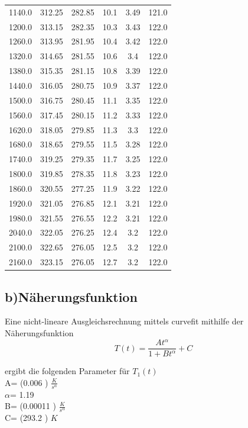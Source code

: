 \begin{table}
\begin{tabular}{cccccc}
1140.0 & 312.25 & 282.85 & 10.1 & 3.49 & 121.0 \\
1200.0 & 313.15 & 282.35 & 10.3 & 3.43 & 122.0 \\
1260.0 & 313.95 & 281.95 & 10.4 & 3.42 & 122.0 \\
1320.0 & 314.65 & 281.55 & 10.6 & 3.4 & 122.0 \\
1380.0 & 315.35 & 281.15 & 10.8 & 3.39 & 122.0 \\
1440.0 & 316.05 & 280.75 & 10.9 & 3.37 & 122.0 \\
1500.0 & 316.75 & 280.45 & 11.1 & 3.35 & 122.0 \\
1560.0 & 317.45 & 280.15 & 11.2 & 3.33 & 122.0 \\
1620.0 & 318.05 & 279.85 & 11.3 & 3.3 & 122.0 \\
1680.0 & 318.65 & 279.55 & 11.5 & 3.28 & 122.0 \\
1740.0 & 319.25 & 279.35 & 11.7 & 3.25 & 122.0 \\
1800.0 & 319.85 & 278.35 & 11.8 & 3.23 & 122.0 \\
1860.0 & 320.55 & 277.25 & 11.9 & 3.22 & 122.0 \\
1920.0 & 321.05 & 276.85 & 12.1 & 3.21 & 122.0 \\
1980.0 & 321.55 & 276.55 & 12.2 & 3.21 & 122.0 \\
2040.0 & 322.05 & 276.25 & 12.4 & 3.2 & 122.0 \\
2100.0 & 322.65 & 276.05 & 12.5 & 3.2 & 122.0 \\
2160.0 & 323.15 & 276.05 & 12.7 & 3.2 & 122.0 \\
\end{tabular}
\end{table}
\newpage
\subsection{b)Näherungsfunktion}
Eine nicht-lineare Ausgleichsrechnung mittels curvefit mithilfe der Näherungsfunktion
\begin{equation}
\label{eqn:naeherungsfunktion}
T(t)=\frac{At^\alpha}{1+Bt^\alpha}+C
\end{equation}

ergibt die folgenden Parameter
für $T_1(t)$\\

A= (0.006 ) $\frac{K}{s^\alpha}$ \\
$\alpha$= 1.19  \\
B= (0.00011 ) $\frac{K}{s^\alpha}$\\
C= (293.2 ) $K$ \\


